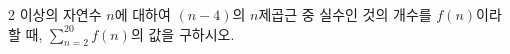 $2$ 이상의 자연수 $n$에 대하여 $(n-4)$의 $n$제곱근 중 실수인 것의 개수를 $f(n)$이라 할 때, $\displaystyle\sum_{n=2}^{20} f(n)$의 값을 구하시오.
